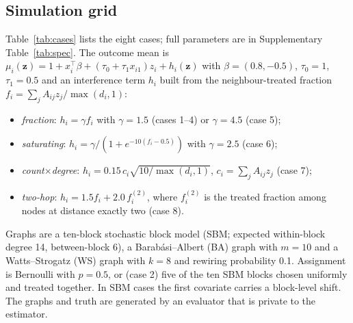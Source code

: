 \documentclass{article}
\begin{document}
\subsection{Simulation grid}
Table~\ref{tab:cases} lists the eight cases; full parameters are in Supplementary Table~\ref{tab:spec}. The outcome mean is $\mu_i(\mathbf z)=1+x_i^\top\beta+(\tau_0+\tau_1x_{i1})z_i+h_i(\mathbf z)$ with $\beta=(0.8,-0.5)$, $\tau_0=1$, $\tau_1=0.5$ and an interference term $h_i$ built from the neighbour-treated fraction $f_i=\sum_jA_{ij}z_j/\max(d_i,1)$:
\begin{itemize}\setlength{\itemsep}{0pt}
\item \emph{fraction}: $h_i=\gamma f_i$ with $\gamma=1.5$ (cases 1--4) or $\gamma=4.5$ (case 5);
\item \emph{saturating}: $h_i=\gamma/(1+e^{-10(f_i-0.5)})$ with $\gamma=2.5$ (case 6);
\item \emph{count$\times$degree}: $h_i=0.15\,c_i\sqrt{10/\max(d_i,1)}$, $c_i=\sum_jA_{ij}z_j$ (case 7);
\item \emph{two-hop}: $h_i=1.5f_i+2.0\,f^{(2)}_i$, where $f^{(2)}_i$ is the treated fraction among nodes at distance exactly two (case 8).
\end{itemize}
Graphs are a ten-block stochastic block model (SBM; expected within-block degree 14, between-block 6), a Barab\'asi--Albert (BA) graph with $m=10$ and a Watts--Strogatz (WS) graph with $k=8$ and rewiring probability 0.1. Assignment is Bernoulli with $p=0.5$, or (case 2) five of the ten SBM blocks chosen uniformly and treated together. In SBM cases the first covariate carries a block-level shift. The graphs and truth are generated by an evaluator that is private to the estimator.
\end{document}
